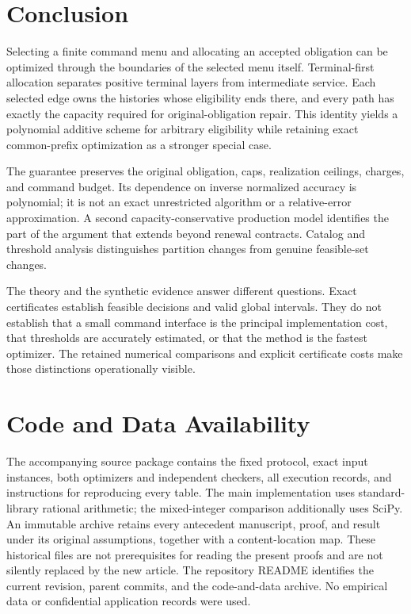 \section{Conclusion}
Selecting a finite command menu and allocating an accepted obligation can be optimized through the boundaries of the selected menu itself. Terminal-first allocation separates positive terminal layers from intermediate service. Each selected edge owns the histories whose eligibility ends there, and every path has exactly the capacity required for original-obligation repair. This identity yields a polynomial additive scheme for arbitrary eligibility while retaining exact common-prefix optimization as a stronger special case.

The guarantee preserves the original obligation, caps, realization ceilings, charges, and command budget. Its dependence on inverse normalized accuracy is polynomial; it is not an exact unrestricted algorithm or a relative-error approximation. A second capacity-conservative production model identifies the part of the argument that extends beyond renewal contracts. Catalog and threshold analysis distinguishes partition changes from genuine feasible-set changes.

The theory and the synthetic evidence answer different questions. Exact certificates establish feasible decisions and valid global intervals. They do not establish that a small command interface is the principal implementation cost, that thresholds are accurately estimated, or that the method is the fastest optimizer. The retained numerical comparisons and explicit certificate costs make those distinctions operationally visible.

\section*{Code and Data Availability}
The accompanying source package contains the fixed protocol, exact input instances, both optimizers and independent checkers, all execution records, and instructions for reproducing every table. The main implementation uses standard-library rational arithmetic; the mixed-integer comparison additionally uses SciPy. An immutable archive retains every antecedent manuscript, proof, and result under its original assumptions, together with a content-location map. These historical files are not prerequisites for reading the present proofs and are not silently replaced by the new article. The repository README identifies the current revision, parent commits, and the code-and-data archive. No empirical data or confidential application records were used.
